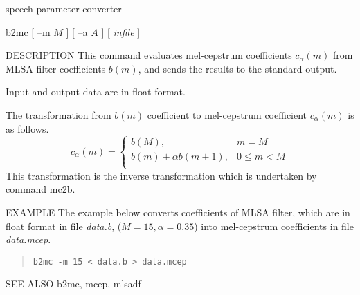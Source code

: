 %
{speech parameter converter}

\begin{synopsis}
\item [b2mc] [ --m $M$ ] [ --a $A$ ] [ {\em infile} ]
\end{synopsis}

\begin{qsection}{DESCRIPTION}
This command evaluates mel-cepstrum coefficients $c_\alpha(m)$ from
MLSA filter coefficients $b(m)$, and sends the results to the standard
output.
\par
Input and output data are in float format.
\par
The transformation from $b(m)$ coefficient to mel-cepstrum coefficient
$c_\alpha(m)$ is as follows.
\begin{displaymath}
c_\alpha(m) = \left\{
	\begin{array}{ll}
	  b(M), & m=M \\
	  b(m) + \alpha b(m+1), & 0 \leq m < M \\
	\end{array} \right.
\end{displaymath}
This transformation is the inverse transformation which is undertaken
by command mc2b.

\end{qsection}


\begin{qsection}{EXAMPLE}
The example below converts coefficients of MLSA filter,
which are in float format in file {\em data.b},
($M=15, \alpha=0.35$) into mel-cepstrum coefficients
in file {\em data.mcep}.
\begin{quote}
 \verb!b2mc -m 15 < data.b > data.mcep!
\end{quote} 
\end{qsection}

\begin{qsection}{SEE ALSO}
b2mc, mcep, mlsadf
\end{qsection}
